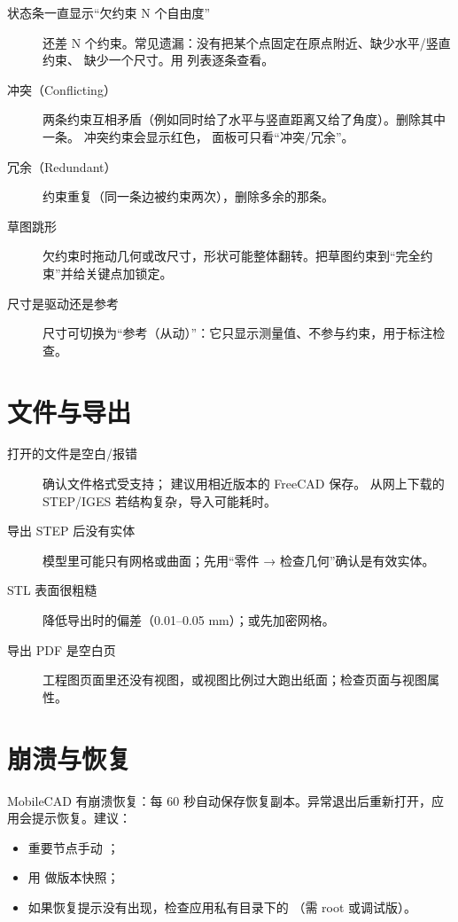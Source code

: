 \begin{description}
  \item[状态条一直显示“欠约束 N 个自由度”] 还差 N 个约束。常见遗漏：没有把某个点固定在原点附近、缺少水平/竖直约束、
        缺少一个尺寸。用  列表逐条查看。
  \item[冲突（Conflicting）] 两条约束互相矛盾（例如同时给了水平与竖直距离又给了角度）。删除其中一条。
        冲突约束会显示红色， 面板可只看“冲突/冗余”。
  \item[冗余（Redundant）] 约束重复（同一条边被约束两次），删除多余的那条。
  \item[草图跳形] 欠约束时拖动几何或改尺寸，形状可能整体翻转。把草图约束到“完全约束”并给关键点加锁定。
  \item[尺寸是驱动还是参考] 尺寸可切换为“参考（从动）”：它只显示测量值、不参与约束，用于标注检查。
\end{description}

\section{文件与导出}

\begin{description}
  \item[打开的文件是空白/报错] 确认文件格式受支持； 建议用相近版本的 FreeCAD 保存。
        从网上下载的 STEP/IGES 若结构复杂，导入可能耗时。
  \item[导出 STEP 后没有实体] 模型里可能只有网格或曲面；先用“零件 → 检查几何”确认是有效实体。
  \item[STL 表面很粗糙] 降低导出时的偏差（0.01--0.05 mm）；或先加密网格。
  \item[导出 PDF 是空白页] 工程图页面里还没有视图，或视图比例过大跑出纸面；检查页面与视图属性。
\end{description}

\section{崩溃与恢复}

MobileCAD 有崩溃恢复：每 60 秒自动保存恢复副本。异常退出后重新打开，应用会提示恢复。建议：
\begin{itemize}
  \item 重要节点手动 ；
  \item 用  做版本快照；
  \item 如果恢复提示没有出现，检查应用私有目录下的 （需 root 或调试版）。
\end{itemize}

